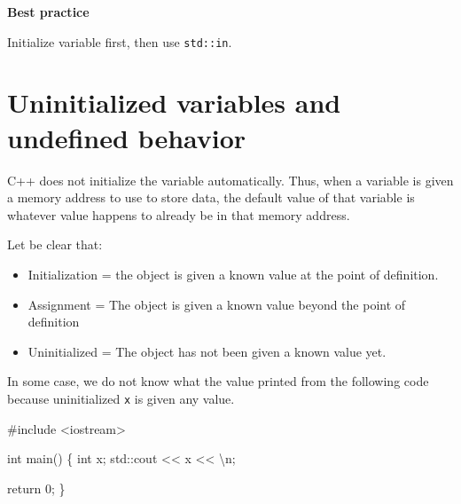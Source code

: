 \documentclass[
  letterpaper,
  DIV=11,
  numbers=noendperiod]{scrreprt}
\newenvironment{Shaded}{\begin{snugshade}}{\end{snugshade}}
\newcommand{\CommentTok}[1]{\textcolor[rgb]{0.37,0.37,0.37}{#1}}
\newcommand{\DecValTok}[1]{\textcolor[rgb]{0.68,0.00,0.00}{#1}}
\newcommand{\ErrorTok}[1]{\textcolor[rgb]{0.68,0.00,0.00}{#1}}
\newcommand{\FunctionTok}[1]{\textcolor[rgb]{0.28,0.35,0.67}{#1}}
\newcommand{\NormalTok}[1]{\textcolor[rgb]{0.00,0.23,0.31}{#1}}
\newcommand{\SpecialCharTok}[1]{\textcolor[rgb]{0.37,0.37,0.37}{#1}}
\newcommand{\StringTok}[1]{\textcolor[rgb]{0.13,0.47,0.30}{#1}}
\providecommand{\tightlist}{%
  \setlength{\itemsep}{0pt}\setlength{\parskip}{0pt}}\usepackage{longtable,booktabs,array}
\begin{document}
\begin{tcolorbox}[enhanced jigsaw, toprule=.15mm, rightrule=.15mm, opacityback=0, breakable, leftrule=.75mm, colback=white, colframe=quarto-callout-note-color-frame, arc=.35mm, left=2mm, bottomrule=.15mm]
\begin{minipage}[t]{5.5mm}
\textcolor{quarto-callout-note-color}{\faInfo}
\end{minipage}%
\begin{minipage}[t]{\textwidth - 5.5mm}

\textbf{Best practice}\vspace{2mm}

Initialize variable first, then use \texttt{std::in}.

\end{minipage}%
\end{tcolorbox}

\hypertarget{uninitialized-variables-and-undefined-behavior}{%
\section{Uninitialized variables and undefined
behavior}\label{uninitialized-variables-and-undefined-behavior}}

C++ does not initialize the variable automatically. Thus, when a
variable is given a memory address to use to store data, the default
value of that variable is whatever value happens to already be in that
memory address.

Let be clear that:

\begin{itemize}
\tightlist
\item
  Initialization = the object is given a known value at the point of
  definition.
\item
  Assignment = The object is given a known value beyond the point of
  definition
\item
  Uninitialized = The object has not been given a known value yet.
\end{itemize}

In some case, we do not know what the value printed from the following
code because uninitialized \texttt{x} is given any value.

\begin{Shaded}
\begin{Highlighting}[]
\CommentTok{\#include \textless{}iostream\textgreater{}}

\NormalTok{int }\FunctionTok{main}\NormalTok{()}
\NormalTok{\{}
\NormalTok{    int x;}
\NormalTok{    std}\SpecialCharTok{::}\NormalTok{cout }\SpecialCharTok{\textless{}}\ErrorTok{\textless{}}\NormalTok{ x }\SpecialCharTok{\textless{}}\ErrorTok{\textless{}} \StringTok{\textquotesingle{}}\SpecialCharTok{\textbackslash{}n}\StringTok{\textquotesingle{}}\NormalTok{;}

\NormalTok{    return }\DecValTok{0}\NormalTok{;}
\NormalTok{\}}
\end{Highlighting}
\end{Shaded}
\end{document}
